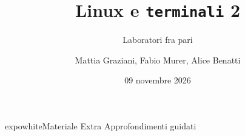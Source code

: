 \documentclass{beamer}
\title{\LARGE{Linux e \texttt{terminali} 2}}
\author{Mattia Graziani, Fabio Murer, Alice Benatti}
\date{09 novembre 2026}
\subtitle{{\Large Laboratori fra pari}}
\begin{document}
\maketitle
{} %

\makeatletter
\makeatother









% 








% 


\begin{chapter}{expowhite}{Materiale Extra}
  \large Approfondimenti guidati
\end{chapter}




    
\end{document}
